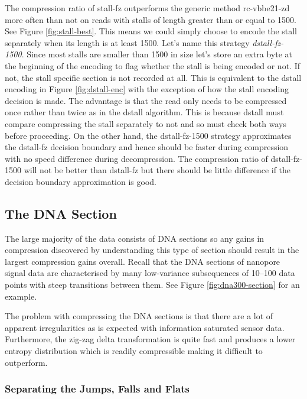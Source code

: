 The compression ratio of stall-fz outperforms the generic method rc-vbbe21-zd
more often than not on reads with stalls of length greater than or equal to
1500. See Figure
\ref{fig:stall-best}. This means we could simply choose to encode the stall
separately when its length is at least 1500. Let's name this strategy
\textit{dstall-fz-1500}. Since most stalls are smaller than
1500 in size let's store an extra byte at the beginning of the encoding to flag
whether the stall is being encoded or not. If not, the stall specific section is
not recorded at all. This is equivalent to the dstall encoding in Figure
\ref{fig:dstall-enc} with the exception of how the stall encoding decision is
made. The advantage is that the read only needs to be compressed once rather
than twice as in the dstall algorithm. This is because dstall must compare
compressing the stall separately to not and so must check both ways before
proceeding. On the other hand, the dstall-fz-1500 strategy approximates the
dstall-fz decision boundary and hence should be faster during compression with
no speed difference during decompression. The compression ratio of
dstall-fz-1500 will not be better than dstall-fz but there should be little
difference if the decision boundary approximation is good.

%


\subsection{The DNA Section}



The large majority of the data consists of DNA sections so any gains in
compression discovered by understanding this type of section should
result in the largest compression gains overall. Recall that the DNA sections of
nanopore signal data are characterised by many low-variance subsequences of 10--100
data points with steep transitions between them. See Figure
\ref{fig:dna300-section} for an example.

The problem with compressing the DNA sections is that there are a lot of
apparent irregularities as is expected with information saturated sensor data.
Furthermore, the zig-zag delta transformation is quite fast and produces a lower
entropy distribution which is readily compressible making it difficult to outperform.

\subsubsection{Separating the Jumps, Falls and Flats}

